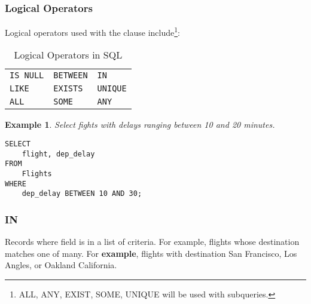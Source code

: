 \documentclass{article}
\newtheorem{example}{Example}
\begin{document}
\subsubsection*{Logical Operators}

Logical operators used with the \verb@WHERE@ clause include\footnote{ALL, ANY, EXIST, SOME, UNIQUE will be used with subqueries.    }: 
\begin{table}[h!]
    \centering
    \begin{tabular}{lll}
    \hline
        \texttt{IS NULL} \hspace{0.5cm}  & \texttt{BETWEEN}\hspace{0.5cm}  & \texttt{IN}  \\
         \texttt{LIKE} \hspace{0.5cm}  & \texttt{EXISTS}  \hspace{0.5cm}  &  \texttt{UNIQUE} \\
          \texttt{ALL}  \hspace{0.5cm}  & \texttt{SOME}  \hspace{0.5cm}  & \texttt{ANY}  \\
    \hline 
    \end{tabular}
    \caption{Logical Operators in SQL}
    \label{tab:logical}
\end{table}









\begin{example}
Select fights with delays ranging between 10 and 20 minutes.
\end{example}

\begin{lstlisting}[frame=single]  
SELECT 
    flight, dep_delay
FROM
    Flights
WHERE
    dep_delay BETWEEN 10 AND 30;
\end{lstlisting} 




\subsubsection*{IN}
Records where field is in a list of criteria.  For example, flights whose destination matches one of many.  For  \textbf{example}, flights with destination San Francisco, Los Angles, or Oakland California.   
\end{document}
